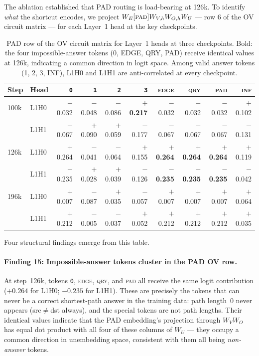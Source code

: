 \documentclass[11pt, a4paper]{article}
\begin{document}
The ablation established that PAD routing is load-bearing at 126k. To identify
\emph{what} the shortcut encodes, we project $W_E[\textsc{pad}] W_{V,h} W_{O,h} W_U$
--- row 6 of the OV circuit matrix --- for each Layer~1 head at the key checkpoints.

\begin{table}[H]
\centering
\small
\setlength{\tabcolsep}{4pt}
\begin{tabular}{@{}llrrrrrrrr@{}}
\toprule
Step & Head & \texttt{0} & \texttt{1} & \texttt{2} & \texttt{3}
          & \textsc{edge} & \textsc{qry} & \textsc{pad} & \textsc{inf} \\
\midrule
100k & L1H0 & $-$0.032 & $-$0.048 & $-$0.086 & $+$\textbf{0.217}
             & $-$0.032 & $-$0.032 & $-$0.032 & $+$0.102 \\
     & L1H1 & $-$0.067 & $+$0.090 & $+$0.059 & $-$0.177
             & $-$0.067 & $-$0.067 & $-$0.067 & $-$0.131 \\
\midrule
126k & L1H0 & $+$0.264 & $-$0.041 & $-$0.064 & $+$0.155
             & $+$\textbf{0.264} & $+$\textbf{0.264} & $+$\textbf{0.264} & $+$0.119 \\
     & L1H1 & $-$0.235 & $+$0.028 & $+$0.039 & $-$0.126
             & $-$\textbf{0.235} & $-$\textbf{0.235} & $-$\textbf{0.235} & $-$0.042 \\
\midrule
196k & L1H0 & $+$0.007 & $-$0.087 & $+$0.035 & $-$0.057
             & $+$0.007 & $+$0.007 & $+$0.007 & $+$0.064 \\
     & L1H1 & $+$0.212 & $-$0.005 & $-$0.037 & $+$0.052
             & $+$0.212 & $+$0.212 & $+$0.212 & $+$0.035 \\
\bottomrule
\end{tabular}
\caption{PAD row of the OV circuit matrix for Layer~1 heads at three
  checkpoints. Bold: the four impossible-answer tokens (0, EDGE, QRY, PAD)
  receive identical values at 126k, indicating a common direction in logit space.
  Among valid answer tokens (1, 2, 3, INF), L1H0 and L1H1 are anti-correlated
  at every checkpoint.}
\label{tab:pad-row}
\end{table}

Four structural findings emerge from this table.

\paragraph{Finding 15: Impossible-answer tokens cluster in the PAD OV row.}
At step~126k, tokens \texttt{0}, \textsc{edge}, \textsc{qry}, and \textsc{pad}
all receive the same logit contribution ($+0.264$ for L1H0; $-0.235$ for L1H1).
These are precisely the tokens that can never be a correct shortest-path answer
in the training data: path length~0 never appears (src$\neq$dst always), and
the special tokens are not path lengths. Their identical values indicate that
the PAD embedding's projection through $W_V W_O$ has equal dot product with all
four of these columns of $W_U$ --- they occupy a common direction in unembedding
space, consistent with them all being \emph{non-answer} tokens.
\end{document}
